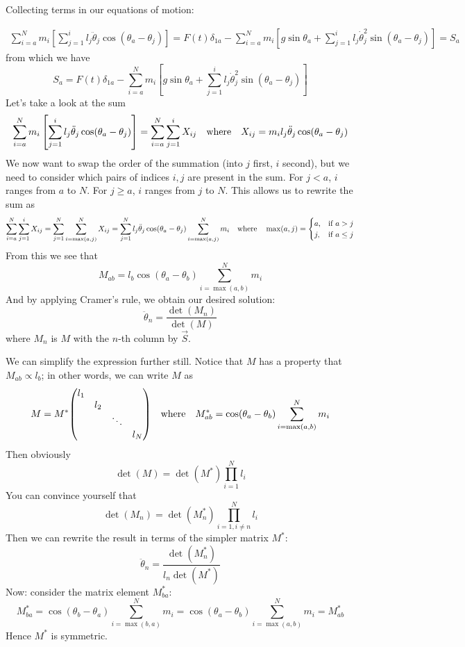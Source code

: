 \documentclass[12pt]{article}
\begin{document}
	Collecting terms in our equations of motion:
	
	\begin{eqnarray*}
	\sum_{i=a}^N m_i\left[\sum_{j=1}^il_j\ddot{\theta}_j\cos(\theta_a-\theta_j) \right]=F(t)\delta_{1a}-\sum_{i=a}^N m_i\left[g \sin{\theta_a} + \sum_{j=1}^il_j \dot{\theta}_j^2 \sin(\theta_a-\theta_j) \right] = S_a
	\end{eqnarray*}
	from which we have
	$$S_a = F(t)\delta_{1a}-\sum_{i=a}^N m_i\left[g \sin{\theta_a} + \sum_{j=1}^il_j \dot{\theta}_j^2 \sin(\theta_a-\theta_j) \right]$$
	Let's take a look at the sum
	$$\sum_{i=a}^N m_i\left[\sum_{j=1}^il_j\ddot{\theta}_j\cos(\theta_a-\theta_j) \right]=\sum_{i=a}^N \sum_{j=1}^i X_{ij}\qq{where} X_{ij}=m_il_j\ddot{\theta}_j\cos(\theta_a-\theta_j)$$
	We now want to swap the order of the summation (into $j$ first, $i$ second), but we need to consider which pairs of indices $i,j$ are present in the sum. For $j<a$, $i$ ranges from $a$ to $N$. For $j\geq a$, $i$ ranges from $j$ to $N$. This allows us to rewrite the sum as
	\begin{eqnarray*}
	\sum_{i=a}^N \sum_{j=1}^i X_{ij}=\sum_{j=1}^N \sum_{i=\max(a,j)}^N X_{ij}=\sum_{j=1}^N l_j\ddot{\theta}_j\cos(\theta_a-\theta_j)\sum_{i=\max(a,j)}^N m_i \qq{where} \max(a,j)=\begin{cases}
			a, & \text{if $a>j$}\\
      j, & \text{if $a\leq j$}
		 \end{cases}
	\end{eqnarray*}
	From this we see that
	$$M_{ab}=l_b\cos(\theta_a-\theta_b)\sum_{i=\max(a,b)}^N m_i$$
	And by applying Cramer's rule, we obtain our desired solution:
	$$\ddot{\theta}_n=\frac{\det(M_n)}{\det(M)}$$
	where $M_n$ is $M$ with the $n$-th column by $\vec{S}$.
	
	We can simplify the expression further still. Notice that $M$ has a property that $M_{ab}\propto l_b$; in other words, we can write $M$ as
	$$M=M^*\mqty(\dmat{l_1,l_2,\ddots, l_N})\qq{where} M_{ab}^*=\cos(\theta_a-\theta_b)\sum_{i=\max(a,b)}^N m_i$$
	Then obviously
	$$\det(M)=\det(M^*)\prod_{i=1}^Nl_i$$
	You can convince yourself that
	$$\det(M_n)=\det(M_n^*)\prod_{i=1,i\neq n}^Nl_i$$
	Then we can rewrite the result in terms of the simpler matrix $M^*$:
	$$\ddot{\theta}_n=\frac{\det(M_n^*)}{l_n\det(M^*)}$$
	Now: consider the matrix element $M_{ba}^*$:
	$$M_{ba}^*=\cos(\theta_b-\theta_a)\sum_{i=\max(b,a)}^N m_i=\cos(\theta_a-\theta_b)\sum_{i=\max(a,b)}^N m_i=M_{ab}^*$$
	Hence $M^*$ is symmetric.
	
\end{document}
